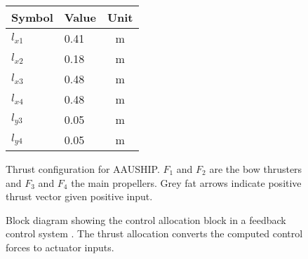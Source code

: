 \begin{figure}[htbp]
	\centering
	\begin{minipage}[l]{0.3\textwidth}
		\begin{tabular}{llc}
		\toprule
		Symbol & Value & Unit\\
		\midrule
		$l_{x1}$& 0.41 & m\\
		$l_{x2}$& 0.18 & m\\
		$l_{x3}$& 0.48 & m\\
		$l_{x4}$& 0.48 & m\\
		$l_{y3}$& 0.05 & m\\
		$l_{y4}$& 0.05 & m\\
		\bottomrule
		\end{tabular}
	\end{minipage}%
\noindent
	\begin{minipage}[l]{0.7\textwidth}
		
	\end{minipage}
	\caption{Thrust configuration for AAUSHIP. $F_1$ and $F_2$ are the
	bow thrusters and $F_3$ and $F_4$ the main propellers. Grey fat
arrows indicate positive thrust vector given positive input.} 
	\label{fig:thrust_allocation}
\end{figure}


\begin{figure}[htbp]
\centering

\caption{Block diagram showing the control allocation block in a
feedback control system \citep[fig.12.25]{fossen}. The thrust
allocation converts the computed control forces to actuator inputs.}
\label{fig:thrust_allocation_block}
\end{figure}
